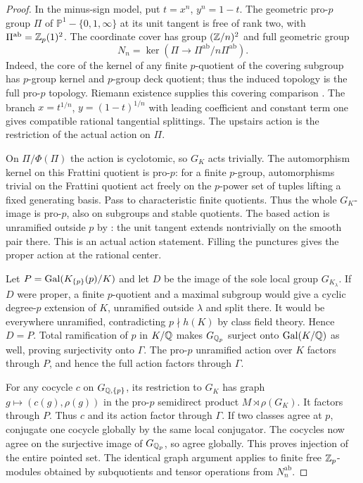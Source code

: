 \begin{proof}
In the minus-sign model, put $t=x^n$, $y^n=1-t$. The geometric
pro-$p$ group $\Pi$ of $\mathbb P^1-\{0,1,\infty\}$ at its
unit tangent is free of rank two, with
$\Pi^{\mathrm{ab}}=\mathbb Z_p(1)^2$. The coordinate cover has group
$(\mathbb Z/n)^2$ and full geometric group
\[
 N_n=\ker(\Pi\longrightarrow\Pi^{\mathrm{ab}}/n\Pi^{\mathrm{ab}}).
\]
Indeed, the core of the kernel of any finite $p$-quotient of the
covering subgroup has $p$-group kernel and $p$-group deck quotient;
thus the induced topology is the full pro-$p$ topology. Riemann
existence supplies this covering comparison
\citep[Expos\'e~XII, Theorem~5.1, p.~251]{SGA1}.
The branch $x=t^{1/n}$, $y=(1-t)^{1/n}$ with leading coefficient
and constant term one gives compatible rational tangential splittings.
The upstairs action is the restriction of the actual action on $\Pi$.

On $\Pi/\Phi(\Pi)$ the action is cyclotomic, so $G_K$ acts
trivially. The automorphism kernel on this Frattini quotient is
pro-$p$: for a finite $p$-group, automorphisms trivial on the
Frattini quotient act freely on the $p$-power set of tuples lifting
a fixed generating basis. Pass to characteristic finite quotients.
Thus the whole $G_K$-image is pro-$p$, also on subgroups and stable
quotients. The based action is unramified outside $p$ by
\citet[Definitions~17.4--17.6, Theorem~17.7 and Corollary~17.8,
pp.~49--51]{Wojtkowiak2009}: the unit tangent extends nontrivially
on the smooth pair there. This is an actual action statement.
Filling the punctures gives the proper action at the rational center.

Let $P=\operatorname{Gal}(K_{\{p\}}(p)/K)$ and let $D$ be the image of the
sole local group $G_{K_\lambda}$. If $D$ were proper, a finite
$p$-quotient and a maximal subgroup would give a cyclic degree-$p$
extension of $K$, unramified outside $\lambda$ and split there.
It would be everywhere unramified, contradicting $p\nmid h(K)$
by class field theory. Hence $D=P$. Total ramification of $p$ in
$K/\mathbb Q$ makes $G_{\mathbb Q_p}$ surject onto $\operatorname{Gal}(K/\mathbb Q)$ as well, proving
surjectivity onto $\Gamma$. The pro-$p$ unramified action over
$K$ factors through $P$, and hence the full action factors through
$\Gamma$.

For any cocycle $c$ on $G_{\mathbb Q,\{p\}}$, its restriction to $G_K$
has graph $g\mapsto(c(g),\rho(g))$ in the pro-$p$ semidirect
product $M\rtimes\rho(G_K)$. It factors through $P$. Thus $c$
and its action factor through $\Gamma$. If two classes agree at
$p$, conjugate one cocycle globally by the same local conjugator.
The cocycles now agree on the surjective image of $G_{\mathbb Q_p}$,
so agree globally. This proves injection of the entire pointed set.
The identical graph argument applies to finite free $\mathbb Z_p$-modules
obtained by subquotients and tensor operations from $N_n^{\mathrm{ab}}$.


\end{proof}
